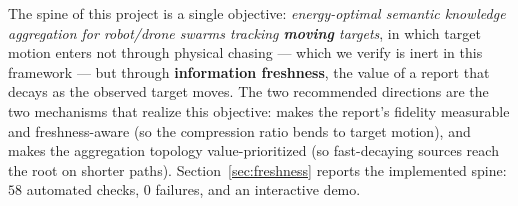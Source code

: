 
The spine of this project is a single objective: \emph{energy-optimal semantic
knowledge aggregation for robot/drone swarms tracking \textbf{moving} targets},
in which target motion enters not through physical chasing --- which we verify is
inert in this framework --- but through \textbf{information freshness}, the value
of a report that decays as the observed target moves. The two recommended
directions are the two mechanisms that realize this objective:  makes the
report's fidelity measurable and freshness-aware (so the compression ratio bends
to target motion), and  makes the aggregation topology value-prioritized
(so fast-decaying sources reach the root on shorter paths). Section~\ref{sec:freshness}
reports the implemented spine: $58$ automated checks, $0$ failures, and an
interactive demo.
